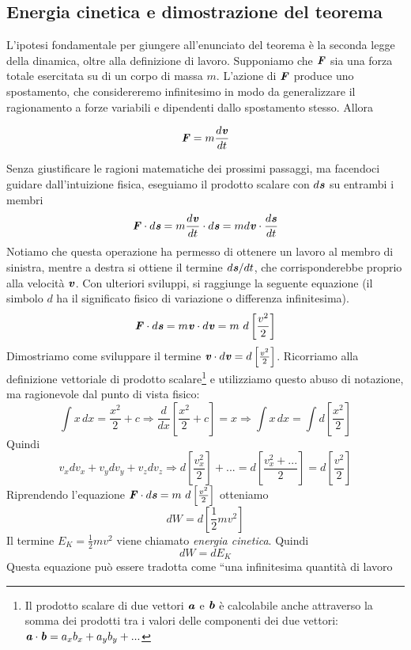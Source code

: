 \subsection{Energia cinetica e dimostrazione del teorema}\label{dimvisviva}
L'ipotesi fondamentale per giungere all'enunciato del teorema
è la seconda legge della dinamica, oltre alla definizione di lavoro.
Supponiamo che $\textbf{\textit{F}}$ sia una forza totale esercitata su
di un corpo di massa $m$. L'azione di $\textbf{\textit{F}}$ produce uno
spostamento, che considereremo infinitesimo in modo da generalizzare
il ragionamento a forze variabili e dipendenti dallo spostamento
stesso. Allora

\[ \textbf{\textit{F}} = m\frac{d\textbf{\textit{v}}}{dt} \]

\noindent Senza giustificare le ragioni matematiche dei prossimi passaggi, ma facendoci
guidare dall'intuizione fisica, eseguiamo il prodotto scalare con $d\textbf{\textit{s}}$
su entrambi i membri
\[ \textbf{\textit{F}}\cdot d\textbf{\textit{s}} = m\frac{d\textbf{\textit{v}}}{dt}\cdot d\textbf{\textit{s}} = m d\textbf{\textit{v}}\cdot\frac{d\textbf{\textit{s}}}{dt} \]
Notiamo che questa operazione ha permesso di ottenere un lavoro al membro di
sinistra, mentre a destra si ottiene il termine $d\textbf{\textit{s}}/dt$, che corrisponderebbe
proprio alla velocità $\textbf{\textit{v}}$. Con ulteriori sviluppi, si raggiunge la
seguente equazione (il simbolo $d$ ha il significato fisico di variazione o
differenza infinitesima).
\[ \textbf{\textit{F}}\cdot d\textbf{\textit{s}} = m\textbf{\textit{v}}\cdot d\textbf{\textit{v}} = m\text{ }d\left[\frac{v^2}{2}\right] \]
Dimostriamo come sviluppare il termine $\textbf{\textit{v}}\cdot d\textbf{\textit{v}} = d\left[\frac{v^2}{2}\right]$.
Ricorriamo alla definizione vettoriale di prodotto scalare\footnote{Il prodotto scalare
di due vettori $\textbf{\textit{a}}$ e $\textbf{\textit{b}}$ è calcolabile anche attraverso la somma
dei prodotti tra i valori delle componenti dei due vettori: $\textbf{\textit{a}}\cdot\textbf{\textit{b}} = a_xb_x + a_yb_y + ...$}
e utilizziamo questo abuso di notazione, ma ragionevole dal punto di vista fisico:
\[ \int x \,dx =  \frac{x^2}{2} + c \Rightarrow \frac{d}{dx}\left[\frac{x^2}{2} + c\right] = x \Rightarrow \int x \,dx = \int d\left[\frac{x^2}{2}\right] \]
Quindi
\[ v_x dv_x + v_y dv_y + v_z dv_z \Rightarrow d\left[\frac{v_x^2}{2}\right] + ... = d\left[\frac{v_x^2 + ...}{2}\right] = d\left[\frac{v^2}{2}\right] \]
Riprendendo l'equazione $\textbf{\textit{F}}\cdot d\textbf{\textit{s}} = m\text{ }d\left[\frac{v^2}{2}\right]$ otteniamo
\[ dW = d\left[\frac12 mv^2\right] \]
Il termine $E_K = \frac{1}{2}mv^2$ viene chiamato \textit{energia cinetica}. Quindi
\[ dW = dE_K \]
Questa equazione può essere tradotta come ``una infinitesima quantità di lavoro
